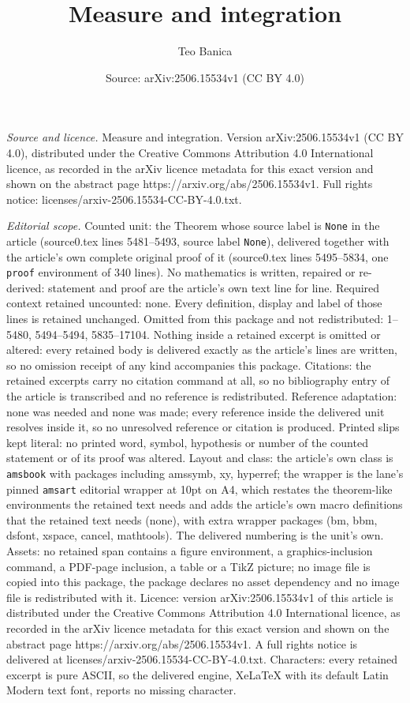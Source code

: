 \documentclass[10pt,a4paper]{amsart}
\title[Measure and integration]{Measure and integration}
\author{Teo Banica}
\date{Source: arXiv:2506.15534v1 (CC BY 4.0)}
\begin{document}
\maketitle

\noindent\emph{Source and licence.} Measure and integration. Version arXiv:2506.15534v1 (CC BY 4.0), distributed under the Creative Commons Attribution 4.0 International licence, as recorded in the arXiv licence metadata for this exact version and shown on the abstract page https://arxiv.org/abs/2506.15534v1. Full rights notice: licenses/arxiv-2506.15534-CC-BY-4.0.txt.\par\smallskip

\noindent\textit{Editorial scope.} Counted unit: the Theorem whose source label is \texttt{None} in the article (source0.tex lines 5481--5493, source label \texttt{None}), delivered together with the article's own complete original proof of it (source0.tex lines 5495--5834, one \texttt{proof} environment of 340 lines). No mathematics is written, repaired or re-derived: statement and proof are the article's own text line for line. Required context retained uncounted: none. Every definition, display and label of those lines is retained unchanged. Omitted from this package and not redistributed: 1--5480, 5494--5494, 5835--17104. Nothing inside a retained excerpt is omitted or altered: every retained body is delivered exactly as the article's lines are written, so no omission receipt of any kind accompanies this package. Citations: the retained excerpts carry no citation command at all, so no bibliography entry of the article is transcribed and no reference is redistributed. Reference adaptation: none was needed and none was made; every reference inside the delivered unit resolves inside it, so no unresolved reference or citation is produced. Printed slips kept literal: no printed word, symbol, hypothesis or number of the counted statement or of its proof was altered. Layout and class: the article's own class is \texttt{amsbook} with packages including amssymb, xy, hyperref; the wrapper is the lane's pinned \texttt{amsart} editorial wrapper at 10pt on A4, which restates the theorem-like environments the retained text needs and adds the article's own macro definitions that the retained text needs (none), with extra wrapper packages (bm, bbm, dsfont, xspace, cancel, mathtools). The delivered numbering is the unit's own. Assets: no retained span contains a figure environment, a graphics-inclusion command, a PDF-page inclusion, a table or a TikZ picture; no image file is copied into this package, the package declares no asset dependency and no image file is redistributed with it. Licence: version arXiv:2506.15534v1 of this article is distributed under the Creative Commons Attribution 4.0 International licence, as recorded in the arXiv licence metadata for this exact version and shown on the abstract page https://arxiv.org/abs/2506.15534v1. A full rights notice is delivered at licenses/arxiv-2506.15534-CC-BY-4.0.txt. Characters: every retained excerpt is pure ASCII, so the delivered engine, XeLaTeX with its default Latin Modern text font, reports no missing character.
\end{document}
